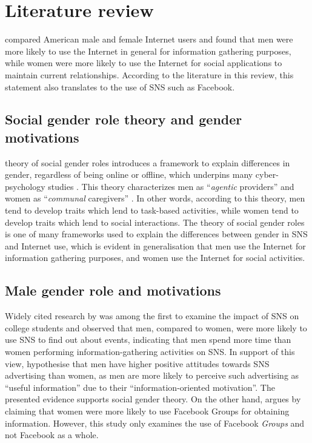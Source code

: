 \section{Literature review}

\citet{Fallows2005} compared American male and female Internet users and found that men were more likely to use the Internet in general for information gathering purposes, while women were more likely to use the Internet for social applications to maintain current relationships. According to the literature in this review, this statement also translates to the use of SNS such as Facebook.

\subsection{Social gender role theory and gender motivations}

 theory of social gender roles introduces a framework to explain differences in gender, regardless of being online or offline, which underpins many cyber-psychology studies \citep{Hum2011, Tifferet2014, Kimbrough2013}. This theory characterizes men as ``\emph{agentic} providers'' and women as ``\emph{communal} caregivers'' \citep[p. 1830]{Hum2011}. In other words, according to this theory, men tend to develop traits which lend to task-based activities, while women tend to develop traits which lend to social interactions. The theory of social gender roles is one of many frameworks used to explain the differences between gender in SNS and Internet use, which is evident in  generalisation that men use the Internet for information gathering purposes, and women use the Internet for social activities.

\subsection{Male gender role and motivations}

Widely cited research by \citet{Raacke2008} was among the first to examine the impact of SNS on college students and observed that men, compared to women, were more likely to use SNS to find out about events, indicating that men spend more time than women performing information-gathering activities on SNS. In support of this view, \citet[p. 2]{Choi2014} hypothesise that men have higher positive attitudes towards SNS advertising than women, as men are more likely to perceive such advertising as ``useful information'' due to their ``information-oriented motivation''. The presented evidence supports  social gender theory. On the other hand, \citet{Park2009} argues by claiming that women were more likely to use Facebook Groups for obtaining information. However, this study only examines the use of Facebook \emph{Groups} and not Facebook as a whole. 

